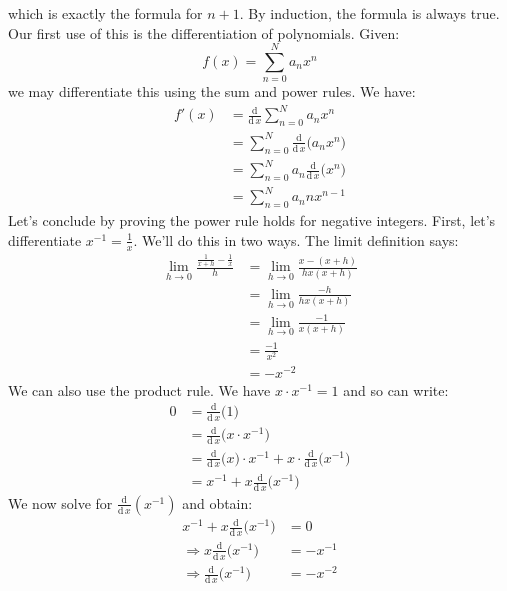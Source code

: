 \documentclass{article}
\theoremstyle{plain}
\begin{document}
    which is exactly the formula for $n+1$. By induction, the formula is always
    true. Our first use of this is the differentiation of polynomials. Given:
    \begin{equation}
        f(x)=\sum_{n=0}^{N}a_{n}x^{n}
    \end{equation}
    we may differentiate this using the sum and power rules. We have:
    \begin{align}
        f'(x)
            &=\frac{\textrm{d}}{\textrm{d}\,x}\sum_{n=0}^{N}a_{n}x^{n}
                \tag{Definition}\\
            &=\sum_{n=0}^{N}\frac{\textrm{d}}{\textrm{d}\,x}\big(a_{n}x^{n}\big)
                \tag{Sum Rule}\\
            &=\sum_{n=0}^{N}a_{n}\frac{\textrm{d}}{\textrm{d}\,x}\big(x^{n}\big)
                \tag{Factoring Constants}\\
            &=\sum_{n=0}^{N}a_{n}nx^{n-1}
                \tag{Power Rule}
    \end{align}
    Let's conclude by proving the power rule holds for negative integers.
    First, let's differentiate $x^{-1}=\frac{1}{x}$. We'll do this in two ways.
    The limit definition says:
    \begin{align}
        \lim_{h\rightarrow{0}}\frac{\frac{1}{x+h}-\frac{1}{x}}{h}
            &=\lim_{h\rightarrow{0}}\frac{x-(x+h)}{hx(x+h)}\\
            &=\lim_{h\rightarrow{0}}\frac{-h}{hx(x+h)}\\
            &=\lim_{h\rightarrow{0}}\frac{-1}{x(x+h)}\\
            &=\frac{-1}{x^{2}}\\
            &=-x^{-2}
    \end{align}
    We can also use the product rule. We have $x\cdot{x}^{-1}=1$ and so can
    write:
    \begin{align}
        0
            &=\frac{\textrm{d}}{\textrm{d}\,x}\big(1\big)\\
            &=\frac{\textrm{d}}{\textrm{d}\,x}\big(x\cdot{x}^{-1}\big)\\
            &=\frac{\textrm{d}}{\textrm{d}\,x}\big(x)\cdot{x}^{-1}
                +x\cdot\frac{\textrm{d}}{\textrm{d}\,x}\big(x^{-1}\big)\\
            &=x^{-1}+x\frac{\textrm{d}}{\textrm{d}\,x}\big(x^{-1}\big)
    \end{align}
    We now solve for $\frac{\textrm{d}}{\textrm{d}\,x}(x^{-1})$ and obtain:
    \begin{align}
        x^{-1}+x\frac{\textrm{d}}{\textrm{d}\,x}\big(x^{-1}\big)&=0\\
        \Rightarrow
            x\frac{\textrm{d}}{\textrm{d}\,x}\big(x^{-1}\big)&=-x^{-1}\\
        \Rightarrow
            \frac{\textrm{d}}{\textrm{d}\,x}\big(x^{-1}\big)&=-x^{-2}
    \end{align}
\end{document}
